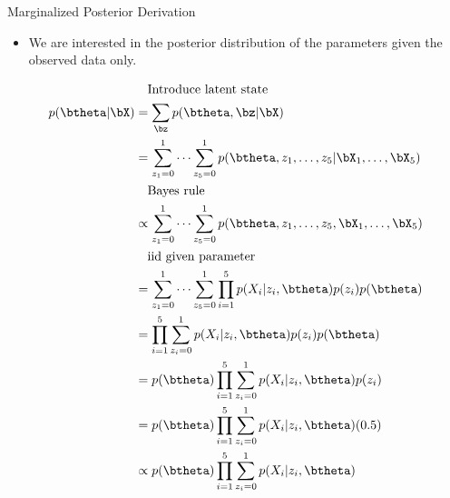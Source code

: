 \documentclass[dvipdfmx,bigger,aspectratio=169]{beamer}
\begin{document}
\begin{frame}[allowframebreaks,label=,t]{Marginalized Posterior Derivation}
\begin{itemize}
\item We are interested in the posterior distribution of the parameters given the observed data only.
\end{itemize}
\begin{align*}
  &~~~\text{Introduce latent state}\\
  p(\btheta | \bX)
  &= \sum_{\bz} p(\btheta, \bz | \bX)\\
  &= \sum^{1}_{z_{1}=0}\dots\sum^{1}_{z_{5}=0} p(\btheta, z_{1},\dots,z_{5} | \bX_{1},\dots,\bX_{5})\\
  &~~~\text{Bayes rule}\\
  &\propto \sum^{1}_{z_{1}=0}\dots\sum^{1}_{z_{5}=0} p(\btheta, z_{1},\dots,z_{5}, \bX_{1},\dots,\bX_{5})\\
  &~~~\text{iid given parameter}\\
  &= \sum^{1}_{z_{1}=0}\dots\sum^{1}_{z_{5}=0} \prod^{5}_{i=1}p(X_{i} | z_{i},\btheta) p(z_{i}) p(\btheta)\\
  &= \prod^{5}_{i=1} \sum^{1}_{z_{i}=0} p(X_{i} | z_{i},\btheta) p(z_{i}) p(\btheta)\\
  &= p(\btheta) \prod^{5}_{i=1} \sum^{1}_{z_{i}=0} p(X_{i} | z_{i},\btheta) p(z_{i})\\
  &= p(\btheta) \prod^{5}_{i=1} \sum^{1}_{z_{i}=0} p(X_{i} | z_{i}, \btheta) (0.5)\\
  &\propto p(\btheta) \prod^{5}_{i=1} \sum^{1}_{z_{i}=0} p(X_{i} | z_{i}, \btheta)
\end{align*}
\end{frame}
\end{document}

